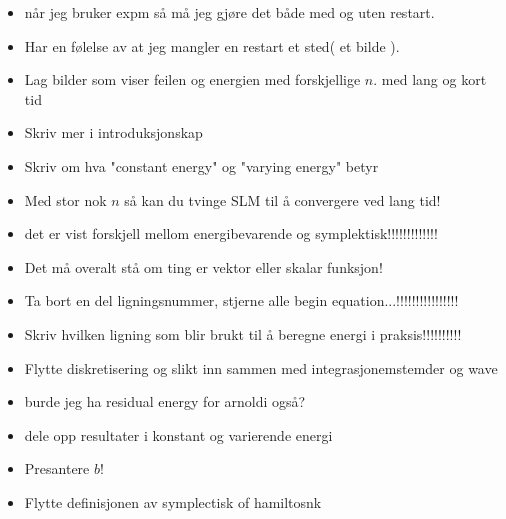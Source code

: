 \begin{itemize}
\item når jeg bruker expm så må jeg gjøre det både med og uten restart.
\item Har en følelse av at jeg mangler en restart et sted( et bilde ).
\item Lag bilder som viser feilen og energien med forskjellige $n$. med lang og kort tid
\item Skriv mer i introduksjonskap
\item Skriv om hva "constant energy" og "varying energy" betyr
\item Med stor nok $n$ så kan du tvinge SLM til å convergere ved lang tid!
\item det er vist forskjell mellom energibevarende og symplektisk!!!!!!!!!!!!!
\item Det må overalt stå om ting er vektor eller skalar funksjon!
\item Ta bort en del ligningsnummer, stjerne alle begin equation...!!!!!!!!!!!!!!!!
\item Skriv hvilken ligning som blir brukt til å beregne energi i praksis!!!!!!!!!!
\item Flytte diskretisering og slikt inn sammen med integrasjonemstemder og wave
\item burde jeg ha residual energy for arnoldi også?
\item dele opp resultater i konstant og varierende energi
\item Presantere $b$!
\item Flytte definisjonen av symplectisk of hamiltosnk
\end{itemize}